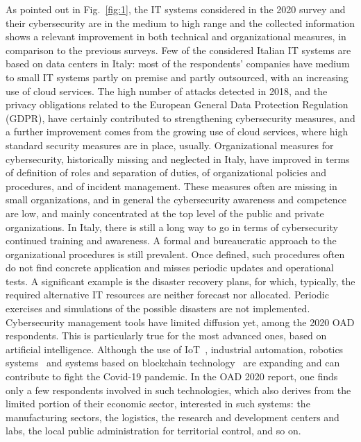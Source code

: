 \documentclass{easychair}
\begin{document}
As pointed out in Fig.~\ref{fig:1}, the IT systems considered in the 2020 survey and their cybersecurity are in the medium to high range and the collected information shows a relevant 
improvement in both technical and organizational measures, in comparison to the previous surveys. Few of the considered Italian IT systems are based on data centers in 
Italy: most of the respondents' companies have medium to small IT systems partly on premise and partly outsourced, with an increasing use of cloud services.
The high number of attacks detected in 2018, and the privacy obligations related to the European
General Data Protection Regulation (GDPR), have certainly contributed to strengthening cybersecurity measures, and a further improvement 
comes from the growing use of cloud services, where high standard security measures are in place, usually. Organizational measures for cybersecurity, historically missing and neglected
in Italy, have improved in terms of definition of roles and separation of duties, of organizational policies and procedures, and of incident management. These measures often are missing
in small organizations, and in general the cybersecurity awareness and competence are low, and mainly concentrated at the top level of the public and private organizations. In Italy, there is 
still a long way to go in terms of cybersecurity continued training and awareness. A formal and bureaucratic approach to the organizational procedures is still prevalent. Once defined,
such procedures often do not find concrete application and misses periodic updates and operational tests. A significant example is the disaster recovery plans, for 
which, typically, the required alternative IT resources are neither forecast nor allocated. Periodic exercises and simulations of the 
possible disasters are not implemented. Cybersecurity management tools have limited diffusion yet, among the 2020 OAD respondents. This is particularly true for
the most advanced ones, based on artificial intelligence.
Although the use of IoT~\cite{JK21}, industrial automation, robotics systems~\cite{SGLMDXHKCZT21} and systems based on blockchain technology~\cite{RMFF21}
are expanding and can contribute to fight the Covid-19 pandemic.
In the OAD 2020 report, one finds only a few respondents involved in such technologies, which also derives from the limited portion
of their economic sector, interested in such systems: the manufacturing sectors, the logistics, the research and 
development centers and labs, the local public administration for territorial control, and so on.
\end{document}

